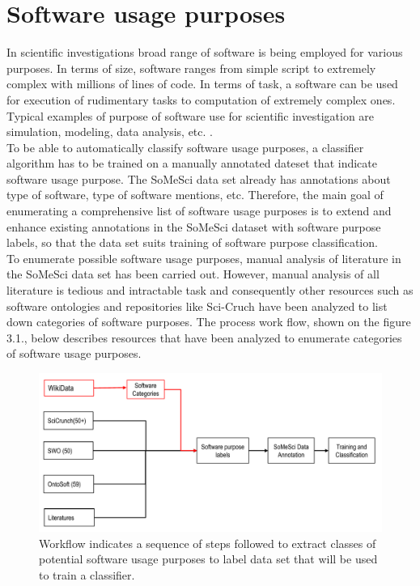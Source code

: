 \chapter{Software usage purposes}
\label{ch:purpose}

%
%
In scientific investigations broad range of software is being employed for various purposes. In terms of size, software ranges from simple script to extremely complex with millions of lines of code. In terms of task, a software can be used for execution of rudimentary tasks to computation of extremely complex ones. Typical examples of purpose of software use for scientific investigation are simulation, modeling, data analysis, etc. \citep{goble2014better}. \\


To be able to automatically classify software usage purposes, a classifier algorithm has to be trained on a manually annotated dateset that indicate software usage purpose. The \ac{SoMeSci} data set already has annotations about type of software, type of software mentions, etc. Therefore, the main goal of enumerating a comprehensive list of software usage purposes is to extend and enhance existing annotations in the SoMeSci dataset with software purpose labels, so that the data set suits training of software purpose classification. \\


To enumerate possible software usage purposes, manual analysis of literature in the SoMeSci data set has been carried out. However, manual analysis of all literature is tedious and intractable task and consequently other resources such as software ontologies and repositories like Sci-Cruch have been analyzed to list down categories of software purposes. The process work flow, shown on the figure 3.1., below describes resources that have been analyzed to enumerate categories of software usage purposes.

\begin{figure}[htbp]
	\centering
	\includegraphics[width=.90\textwidth]{4.graphics/figures/ch_3/softwarePurposeprocess}
	\caption{Workflow indicates a sequence of steps followed to extract classes of potential software usage purposes to label data set that will be used to train a classifier.}
	\label{fig:chapter03:setup}
\end{figure}


